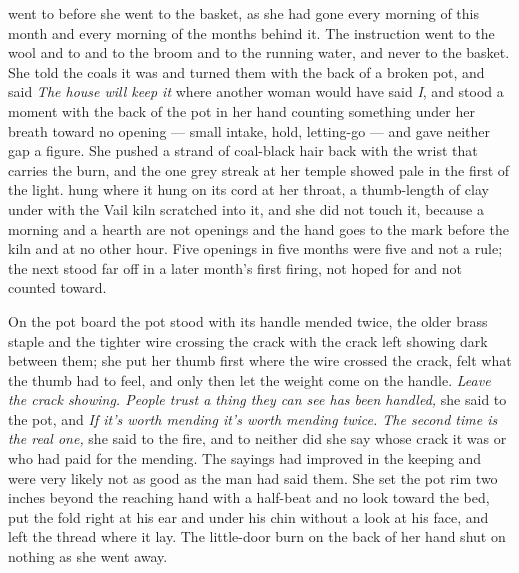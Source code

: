  went to  before she went to the basket, as she had gone every morning of this month and every morning of the months behind it. The instruction went to the wool and to  and to the broom and to the running water, and never to the basket. She told the coals it was  and turned them with the back of a broken pot, and said \emph{The house will keep it} where another woman would have said \emph{I}, and stood a moment with the back of the pot in her hand counting something under her breath toward no opening --- small intake, hold, letting-go --- and gave neither gap a figure. She pushed a strand of coal-black hair back with the wrist that carries the burn, and the one grey streak at her temple showed pale in the first of the light.  hung where it hung on its cord at her throat, a thumb-length of clay under  with the Vail kiln scratched into it, and she did not touch it, because a morning and a hearth are not openings and the hand goes to the mark before the kiln and at no other hour. Five openings in five months were five and not a rule; the next stood far off in a later month's first firing, not hoped for and not counted toward.

On the pot board the pot stood with its handle mended twice, the older brass staple and the tighter wire crossing the crack with the crack left showing dark between them; she put her thumb first where the wire crossed the crack, felt what the thumb had to feel, and only then let the weight come on the handle. \emph{Leave the crack showing. People trust a thing they can see has been handled,} she said to the pot, and \emph{If it's worth mending it's worth mending twice. The second time is the real one,} she said to the fire, and to neither did she say whose crack it was or who had paid for the mending. The sayings had improved in the keeping and were very likely not as good as the man had said them. She set the pot rim two inches beyond the reaching hand with a half-beat and no look toward the bed, put the fold right at his ear and under his chin without a look at his face, and left the thread where it lay. The little-door burn on the back of her hand shut on nothing as she went away.

